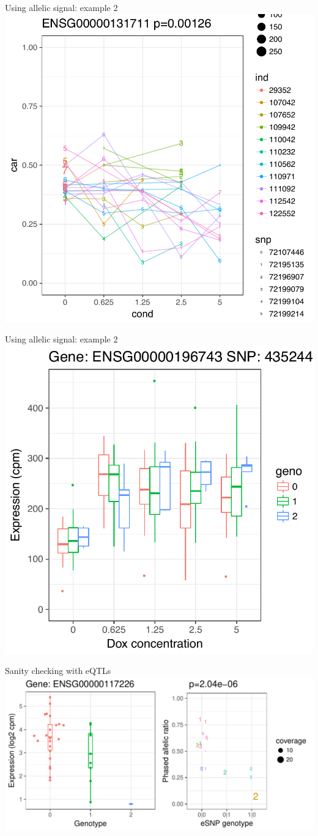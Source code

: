 \documentclass{beamer}
\begin{document}
\begin{frame}{Using allelic signal: example 2}
\centering
\includegraphics[width=.7\textwidth,clip,trim=0 0 0 0]{../figures/5.pdf}
\end{frame}

\begin{frame}{Using allelic signal: example 2}
\centering
\includegraphics[width=.7\textwidth,clip,trim=0 0 0 0]{../figures/example_ai_vs_lrt.pdf}
\end{frame}

\begin{frame}{Sanity checking with eQTLs}
\includegraphics[page=3,width=\textwidth,clip,trim=0 0 0 0]{../figures/phasing_vs_eQTL.pdf} 
\end{frame}
\end{document}
